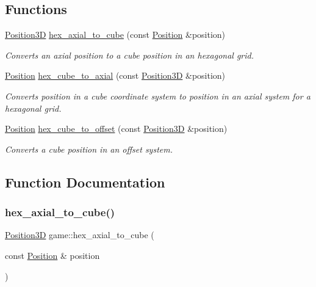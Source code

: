 \subsection*{Functions}
\begin{DoxyCompactItemize}
\item 
\hyperlink{structgame_1_1_position3_d}{Position3D} \hyperlink{namespacegame_a758b3d0eea6eae0e6ce5ea1b8dc90ed9}{hex\+\_\+axial\+\_\+to\+\_\+cube} (const \hyperlink{structgame_1_1_position}{Position} \&position)
\begin{DoxyCompactList}\small\item\em Converts an axial position to a cube position in an hexagonal grid. \end{DoxyCompactList}\item 
\hyperlink{structgame_1_1_position}{Position} \hyperlink{namespacegame_a850c02ba5e94fc33424e8d7a34c93e9f}{hex\+\_\+cube\+\_\+to\+\_\+axial} (const \hyperlink{structgame_1_1_position3_d}{Position3D} \&position)
\begin{DoxyCompactList}\small\item\em Converts position in a cube coordinate system to position in an axial system for a hexagonal grid. \end{DoxyCompactList}\item 
\hyperlink{structgame_1_1_position}{Position} \hyperlink{namespacegame_a0fb03836882da582210ce59b390ad61f}{hex\+\_\+cube\+\_\+to\+\_\+offset} (const \hyperlink{structgame_1_1_position3_d}{Position3D} \&position)
\begin{DoxyCompactList}\small\item\em Converts a cube position in an offset system. \end{DoxyCompactList}\end{DoxyCompactItemize}


\subsection{Function Documentation}
\mbox{\label{namespacegame_a758b3d0eea6eae0e6ce5ea1b8dc90ed9}} 
\subsubsection{\texorpdfstring{hex\+\_\+axial\+\_\+to\+\_\+cube()}{hex\_axial\_to\_cube()}}
{\footnotesize\ttfamily \hyperlink{structgame_1_1_position3_d}{Position3D} game\+::hex\+\_\+axial\+\_\+to\+\_\+cube (\begin{DoxyParamCaption}\item[{const \hyperlink{structgame_1_1_position}{Position} \&}]{position }\end{DoxyParamCaption})}



